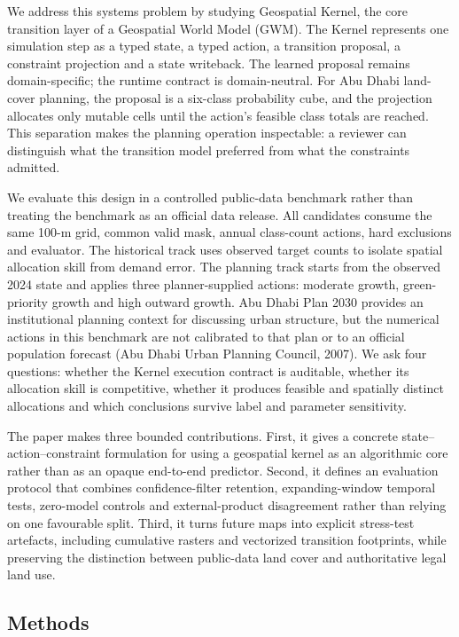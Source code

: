 \documentclass[
]{article}
\begin{document}
We address this systems problem by studying Geospatial Kernel, the core
transition layer of a Geospatial World Model (GWM). The Kernel
represents one simulation step as a typed state, a typed action, a
transition proposal, a constraint projection and a state writeback. The
learned proposal remains domain-specific; the runtime contract is
domain-neutral. For Abu Dhabi land-cover planning, the proposal is a
six-class probability cube, and the projection allocates only mutable
cells until the action's feasible class totals are reached. This
separation makes the planning operation inspectable: a reviewer can
distinguish what the transition model preferred from what the
constraints admitted.

We evaluate this design in a controlled public-data benchmark rather
than treating the benchmark as an official data release. All candidates
consume the same 100-m grid, common valid mask, annual class-count
actions, hard exclusions and evaluator. The historical track uses
observed target counts to isolate spatial allocation skill from demand
error. The planning track starts from the observed 2024 state and
applies three planner-supplied actions: moderate growth, green-priority
growth and high outward growth. Abu Dhabi Plan 2030 provides an
institutional planning context for discussing urban structure, but the
numerical actions in this benchmark are not calibrated to that plan or
to an official population forecast (Abu Dhabi Urban Planning Council,
2007). We ask four questions: whether the Kernel execution contract is
auditable, whether its allocation skill is competitive, whether it
produces feasible and spatially distinct allocations and which
conclusions survive label and parameter sensitivity.

The paper makes three bounded contributions. First, it gives a concrete
state--action--constraint formulation for using a geospatial kernel as
an algorithmic core rather than as an opaque end-to-end predictor.
Second, it defines an evaluation protocol that combines
confidence-filter retention, expanding-window temporal tests, zero-model
controls and external-product disagreement rather than relying on one
favourable split. Third, it turns future maps into explicit stress-test
artefacts, including cumulative rasters and vectorized transition
footprints, while preserving the distinction between public-data land
cover and authoritative legal land use.

\subsection{Methods}\label{methods}
\end{document}
